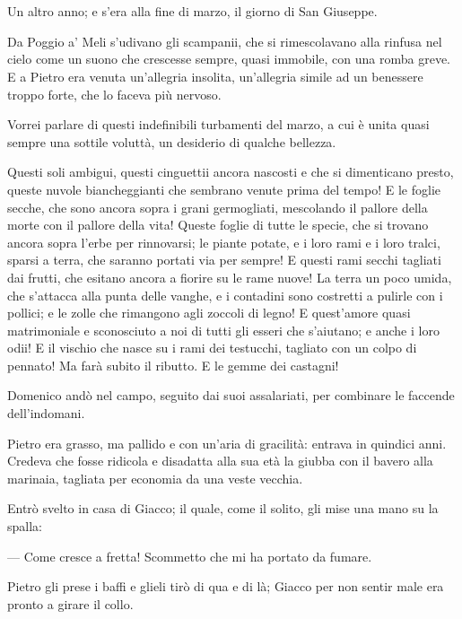 \chapter{}

Un altro anno; e s’era alla fine di marzo, il giorno di San Giuseppe.

Da Poggio a’ Meli s’udivano gli scampanii, che si rimescolavano alla rinfusa nel cielo come un suono che crescesse sempre, quasi immobile, con una romba greve. E a Pietro era venuta un’allegria insolita, un’allegria simile ad un benessere troppo forte, che lo faceva più nervoso.

Vorrei parlare di questi indefinibili turbamenti del marzo, a cui è unita quasi sempre una sottile voluttà, un desiderio di qualche bellezza.

Questi soli ambigui, questi cinguettii ancora nascosti e che si dimenticano presto, queste nuvole biancheggianti che sembrano venute prima del tempo! E le foglie secche, che sono ancora sopra i grani germogliati, mescolando il pallore della morte con il pallore della vita! Queste foglie di tutte le specie, che si trovano ancora sopra l’erbe per rinnovarsi; le piante potate, e i loro rami e i loro tralci, sparsi a terra, che saranno portati via per sempre! E questi rami secchi tagliati dai frutti, che esitano ancora a fiorire su le rame nuove! La terra un poco umida, che s’attacca alla punta delle vanghe, e i contadini sono costretti a pulirle con i pollici; e le zolle che rimangono agli zoccoli di legno! E quest’amore quasi matrimoniale e sconosciuto a noi di tutti gli esseri che s’aiutano; e anche i loro odii! E il vischio che nasce su i rami dei testucchi, tagliato con un colpo di pennato! Ma farà subito il ributto. E le gemme dei castagni!

Domenico andò nel campo, seguito dai suoi assalariati, per combinare le faccende dell’indomani.

Pietro era grasso, ma pallido e con un’aria di gracilità: entrava in quindici anni. Credeva che fosse ridicola e disadatta alla sua età la giubba con il bavero alla marinaia, tagliata per economia da una veste vecchia.

Entrò svelto in casa di Giacco; il quale, come il solito, gli mise una mano su la spalla:

— Come cresce a fretta! Scommetto che mi ha portato da fumare.

Pietro gli prese i baffi e glieli tirò di qua e di là; Giacco per non sentir male era pronto a girare il collo.

